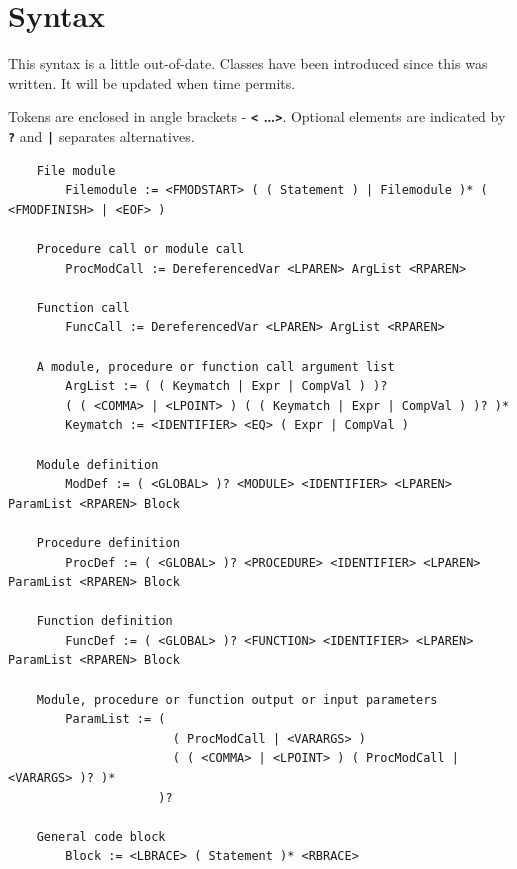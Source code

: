 \pagebreak

\chapter{Syntax}

    This syntax is a little out-of-date. Classes have been introduced since
    this was written. It will be updated when time permits.
    
    Tokens are enclosed in angle brackets - {\bf \verb'<' \dots \verb'>'}.
    Optional elements are indicated by {\bf \verb'?'} and {\bf \verb'|'}
    separates alternatives.

    \begin{verbatim}
    File module
        Filemodule := <FMODSTART> ( ( Statement ) | Filemodule )* ( <FMODFINISH> | <EOF> )

    Procedure call or module call
        ProcModCall := DereferencedVar <LPAREN> ArgList <RPAREN>

    Function call
        FuncCall := DereferencedVar <LPAREN> ArgList <RPAREN>

    A module, procedure or function call argument list
        ArgList := ( ( Keymatch | Expr | CompVal ) )?
        ( ( <COMMA> | <LPOINT> ) ( ( Keymatch | Expr | CompVal ) )? )*
        Keymatch := <IDENTIFIER> <EQ> ( Expr | CompVal )

    Module definition
        ModDef := ( <GLOBAL> )? <MODULE> <IDENTIFIER> <LPAREN> ParamList <RPAREN> Block

    Procedure definition
        ProcDef := ( <GLOBAL> )? <PROCEDURE> <IDENTIFIER> <LPAREN> ParamList <RPAREN> Block

    Function definition
        FuncDef := ( <GLOBAL> )? <FUNCTION> <IDENTIFIER> <LPAREN> ParamList <RPAREN> Block

    Module, procedure or function output or input parameters
        ParamList := (
                       ( ProcModCall | <VARARGS> )
                       ( ( <COMMA> | <LPOINT> ) ( ProcModCall | <VARARGS> )? )*
                     )?

    General code block
        Block := <LBRACE> ( Statement )* <RBRACE>


\end{verbatim}
